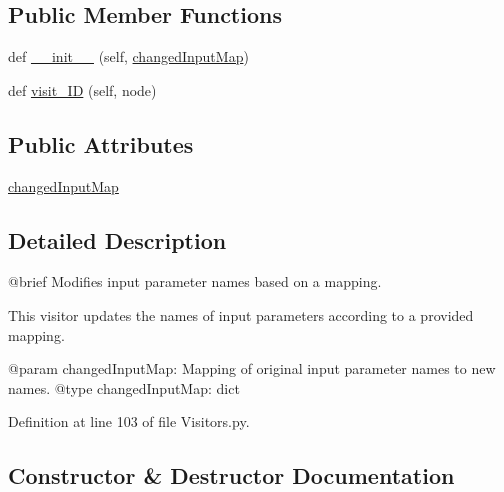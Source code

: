 \subsection*{Public Member Functions}
\begin{DoxyCompactItemize}
\item 
def \hyperlink{classVisitors_1_1InputParamModifier_a1e3784a2a4444d63be94163c3a8508d5}{\+\_\+\+\_\+init\+\_\+\+\_\+} (self, \hyperlink{classVisitors_1_1InputParamModifier_a4ca1ea41a954d2675cd3c1915c9568e9}{changed\+Input\+Map})
\item 
def \hyperlink{classVisitors_1_1InputParamModifier_a876b22ca4502c2197e9881ebf8fb6288}{visit\+\_\+\+ID} (self, node)
\end{DoxyCompactItemize}
\subsection*{Public Attributes}
\begin{DoxyCompactItemize}
\item 
\hyperlink{classVisitors_1_1InputParamModifier_a4ca1ea41a954d2675cd3c1915c9568e9}{changed\+Input\+Map}
\end{DoxyCompactItemize}


\subsection{Detailed Description}
\begin{DoxyVerb}@brief Modifies input parameter names based on a mapping.

This visitor updates the names of input parameters according to a provided mapping.

@param changedInputMap: Mapping of original input parameter names to new names.
@type changedInputMap: dict
\end{DoxyVerb}
 

Definition at line 103 of file Visitors.\+py.



\subsection{Constructor \& Destructor Documentation}
\mbox{\label{classVisitors_1_1InputParamModifier_a1e3784a2a4444d63be94163c3a8508d5}} 

